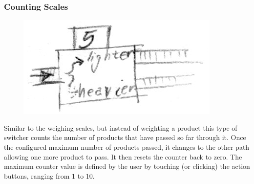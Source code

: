 \documentclass[a4paper]{scrartcl}
\begin{document}
        \subsubsection{Counting Scales}
            \begin{minipage}[t][7em][t]{\textwidth}
                \begin{figure}
                    \vspace{-20pt}
                    \includegraphics[scale=1]{devices/scale}
                    \vspace{-20pt}
                \end{figure}

                Similar to the weighing scales, but instead of weighting a
                product this type of switcher counts the number of products that
                have passed so far through it. Once the configured maximum
                number of products passed, it changes to the other path allowing
                one more product to pass. It then resets the counter back to
                zero. The maximum counter value is defined by the user by
                touching (or clicking) the action buttons, ranging from 1 to 10.
            \end{minipage}
\end{document}
